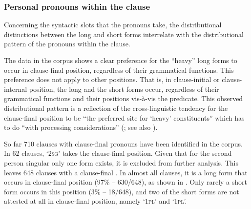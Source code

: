 \clearpage 
\subsubsection[Personal pronouns within the clause]{Personal pronouns within the clause}
\label{Para_6.1.1.2}
Concerning the syntactic slots that the pronouns take, the distributional distinctions between the long and short  forms interrelate with the distributional pattern of the pronouns within the clause.



The data in the corpus shows a clear preference for the ``heavy'' long  forms to occur in clause-final position, regardless of their grammatical functions. This preference does not apply to other positions. That is, in clause-initial or clause-internal position, the long and the short  forms occur, regardless of their grammatical functions and their positions vis-à-vis the predicate. This observed distributional pattern is a reflection of the cross-linguistic tendency for the clause-final position to be “the preferred site for ‘heavy’ constituents” which has to do “with processing considerations” (\citealt[179]{Butler.2003}; see also \citealt[88–114]{Hawkins.1983}).


\largerpage
So far 710 clauses with clause-final pronouns have been identified in the corpus. In 62 clauses,  ‘\textsc{2sg}’ takes the clause-final position. Given that for the second person singular  only one form exists, it is excluded from further analysis. This leaves 648 clauses with a clause-final . In almost all clauses, it is a long  form that occurs in clause-final position (97\% – 630/648), as shown in . Only rarely a short  form occurs in this position (3\% – 18/648), and two of the short forms are not attested at all in clause-final position, namely  ‘\textsc{1pl}’ and  ‘\textsc{1pl}’.


